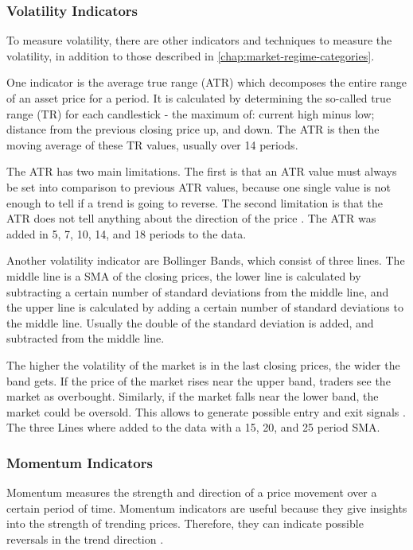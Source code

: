 \subsubsection{Volatility Indicators}

To measure volatility, there are other indicators and techniques to measure the volatility, in addition to those described in \autoref{chap:market-regime-categories}.

One indicator is the average true range (ATR) which decomposes the entire range of an asset price for a period.
It is calculated by determining the so-called true range (TR) for each candlestick - the maximum of: current high minus low; distance from the previous closing price up, and down.
The ATR is then the moving average of these TR values, usually over 14 periods.

The ATR has two main limitations.
The first is that an ATR value must always be set into comparison to previous ATR values, because one single value is not enough to tell if a trend is going to reverse.
The second limitation is that the ATR does not tell anything about the direction of the price \cite{investopia-atr}.
The ATR was added in 5, 7, 10, 14, and 18 periods to the data.

Another volatility indicator are Bollinger Bands, which consist of three lines.
The middle line is a SMA of the closing prices, the lower line is calculated by subtracting a certain number of standard deviations from the middle line, and the upper line is calculated by adding a certain number of standard deviations to the middle line.
Usually the double of the standard deviation is added, and subtracted from the middle line.

The higher the volatility of the market is in the last closing prices, the wider the band gets.
If the price of the market rises near the upper band, traders see the market as overbought.
Similarly, if the market falls near the lower band, the market could be oversold.
This allows to generate possible entry and exit signals \cite{investopia-bb}.
The three Lines where added to the data with a 15, 20, and 25 period SMA.

\subsubsection{Momentum Indicators}

Momentum measures the strength and direction of a price movement over a certain period of time.
Momentum indicators are useful because they give insights into the strength of trending prices.
Therefore, they can indicate possible reversals in the trend direction \cite{investopia-momentum}.

